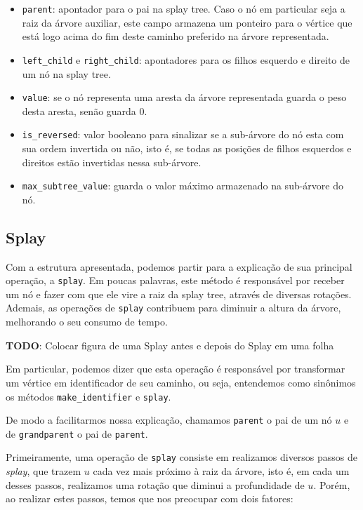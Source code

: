 \begin{itemize}
    \item \texttt{parent}: apontador para o pai na splay tree. Caso o nó em particular seja a raiz da árvore auxiliar, este campo armazena um ponteiro para o vértice que está logo acima do fim deste caminho preferido na árvore representada.
    \item \texttt{left\_child} e \texttt{right\_child}: apontadores para os filhos esquerdo e direito de um nó na splay tree.
    \item \texttt{value}: se o nó representa uma aresta da árvore representada guarda o peso desta aresta, senão guarda 0.
    \item \texttt{is\_reversed}: valor booleano para sinalizar se a sub-árvore do nó esta com sua ordem invertida ou não, isto é, se todas as posições de filhos esquerdos e direitos estão  invertidas nessa  sub-árvore.
    \item \texttt{max\_subtree\_value}: guarda o valor máximo armazenado na sub-árvore do nó.
\end{itemize}

\subsection{Splay}
\label{subsection:lct-splay-splay}

Com a estrutura apresentada, podemos partir para a explicação de sua principal operação, a \texttt{splay}. Em poucas palavras, este método é responsável por receber um nó e fazer com que ele vire a raiz da splay tree, através de diversas rotações.  Ademais, as operações de \texttt{splay} contribuem para diminuir a altura da árvore, melhorando o seu consumo de tempo.

\begin{center}
    \textbf{TODO}: Colocar figura de uma Splay antes e depois do Splay em uma folha
\end{center}

Em particular, podemos dizer que esta operação é responsável por transformar um vértice em identificador de seu caminho, ou seja, entendemos como sinônimos os métodos \texttt{make\_identifier} e \texttt{splay}.

De modo a facilitarmos nossa explicação, chamamos \texttt{parent} o pai de um nó $u$ e de \texttt{grandparent} o pai de \texttt{parent}.

Primeiramente, uma operação de \texttt{splay} consiste em realizamos diversos passos de \emph{splay}, que trazem $u$ cada vez mais próximo à raiz da árvore, isto é, em cada um desses passos, realizamos uma rotação que diminui a profundidade de $u$. Porém, ao realizar estes passos, temos que nos preocupar com dois fatores:

